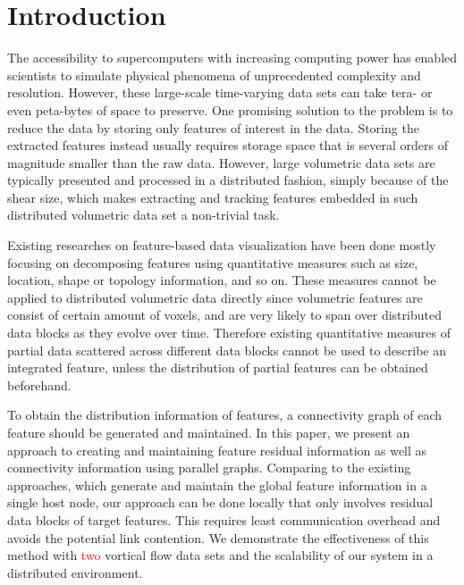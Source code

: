\documentclass[10pt, conference, compsocconf]{IEEEtran}
\begin{document}
\section{Introduction}

The accessibility to supercomputers with increasing computing power has enabled scientists to simulate physical phenomena of unprecedented complexity and resolution. However, these large-scale time-varying data sets can take tera- or even peta-bytes of space to preserve. One promising solution to the problem is to reduce the data by storing only features of interest in the data. Storing the extracted features instead usually requires storage space that is several orders of magnitude smaller than the raw data. However, large volumetric data sets are typically presented and processed in a distributed fashion, simply because of the shear size, which makes extracting and tracking features embedded in such distributed volumetric data set a non-trivial task.

Existing researches on feature-based data visualization have been done mostly focusing on decomposing features using quantitative measures such as size, location, shape or topology information, and so on. These measures cannot be applied to distributed volumetric data directly since volumetric features are consist of certain amount of voxels, and are very likely to span over distributed data blocks as they evolve over time. Therefore existing quantitative measures of partial data scattered across different data blocks cannot be used to describe an integrated feature, unless the distribution of partial features can be obtained beforehand.

To obtain the distribution information of features, a connectivity graph of each feature should be generated and maintained. In this paper, we present an approach to creating and maintaining feature residual information as well as connectivity information using parallel graphs. Comparing to the existing approaches, which generate and maintain the global feature information in a single host node, our approach can be done locally that only involves residual data blocks of target features. This requires least communication overhead and avoids the potential link contention. We demonstrate the effectiveness of this method with \textcolor{red}{two} vortical flow data sets and the scalability of our system in a distributed environment.
\end{document}
